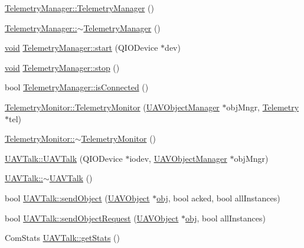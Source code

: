 \begin{DoxyCompactItemize}
\item 
\hyperlink{group___u_a_v_talk_plugin_gaab121ca26ff1b0985b013d715132a088}{Telemetry\-Manager\-::\-Telemetry\-Manager} ()
\item 
\hyperlink{group___u_a_v_talk_plugin_ga28e48a3688e195cc9c3263ccdeb084c4}{Telemetry\-Manager\-::$\sim$\-Telemetry\-Manager} ()
\item 
\hyperlink{group___u_a_v_objects_plugin_ga444cf2ff3f0ecbe028adce838d373f5c}{void} \hyperlink{group___u_a_v_talk_plugin_ga48c17e83f41b742abc5c234963093171}{Telemetry\-Manager\-::start} (Q\-I\-O\-Device $\ast$dev)
\item 
\hyperlink{group___u_a_v_objects_plugin_ga444cf2ff3f0ecbe028adce838d373f5c}{void} \hyperlink{group___u_a_v_talk_plugin_ga59bfea54673b2ab51e9ac1bf3a186718}{Telemetry\-Manager\-::stop} ()
\item 
bool \hyperlink{group___u_a_v_talk_plugin_ga73bf9fbd67f3eb0451363525de9cc7de}{Telemetry\-Manager\-::is\-Connected} ()
\item 
\hyperlink{group___u_a_v_talk_plugin_gad2af9cb530ef07a84cc9992d6458111f}{Telemetry\-Monitor\-::\-Telemetry\-Monitor} (\hyperlink{class_u_a_v_object_manager}{U\-A\-V\-Object\-Manager} $\ast$obj\-Mngr, \hyperlink{class_telemetry}{Telemetry} $\ast$tel)
\item 
\hyperlink{group___u_a_v_talk_plugin_gabe2f26f1992e78356a82b135aeac951e}{Telemetry\-Monitor\-::$\sim$\-Telemetry\-Monitor} ()
\item 
\hyperlink{group___u_a_v_talk_plugin_ga53c36c64288a62b44a285dfb40cee946}{U\-A\-V\-Talk\-::\-U\-A\-V\-Talk} (Q\-I\-O\-Device $\ast$iodev, \hyperlink{class_u_a_v_object_manager}{U\-A\-V\-Object\-Manager} $\ast$obj\-Mngr)
\item 
\hyperlink{group___u_a_v_talk_plugin_ga1c6de05403ed728008c21592d142375e}{U\-A\-V\-Talk\-::$\sim$\-U\-A\-V\-Talk} ()
\item 
bool \hyperlink{group___u_a_v_talk_plugin_gafb99b5df957808785013366dfd5bc636}{U\-A\-V\-Talk\-::send\-Object} (\hyperlink{class_u_a_v_object}{U\-A\-V\-Object} $\ast$\hyperlink{glext_8h_a0c0d4701a6c89f4f7f0640715d27ab26}{obj}, bool acked, bool all\-Instances)
\item 
bool \hyperlink{group___u_a_v_talk_plugin_ga884c8680ea2c95bef75fca2c4c95867d}{U\-A\-V\-Talk\-::send\-Object\-Request} (\hyperlink{class_u_a_v_object}{U\-A\-V\-Object} $\ast$\hyperlink{glext_8h_a0c0d4701a6c89f4f7f0640715d27ab26}{obj}, bool all\-Instances)
\item 
Com\-Stats \hyperlink{group___u_a_v_talk_plugin_gac9f7d49b556190b1b7d4b845b8b23a34}{U\-A\-V\-Talk\-::get\-Stats} ()

\end{DoxyCompactItemize}
